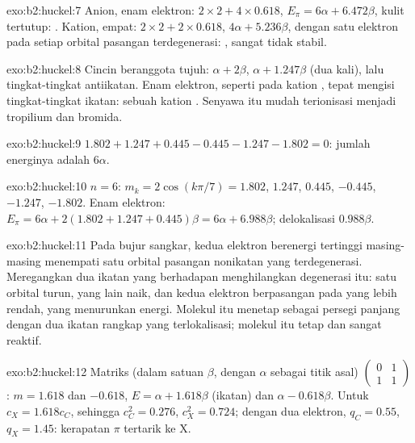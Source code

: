 \begin{solution}{exo:b2:huckel:7}
Anion, enam elektron: $2 \times 2 + 4 \times 0.618$, $E_\pi = 6\alpha + 6.472\beta$,
kulit tertutup: . Kation, empat: $2 \times 2 + 2 \times 0.618$,
$4\alpha + 5.236\beta$, dengan satu elektron pada setiap orbital pasangan
terdegenerasi: , sangat tidak stabil.
\end{solution}

\begin{solution}{exo:b2:huckel:8}
Cincin beranggota tujuh: $\alpha + 2\beta$, $\alpha + 1.247\beta$ (dua kali), lalu
tingkat-tingkat antiikatan. Enam elektron, seperti pada kation
, tepat mengisi tingkat-tingkat ikatan: sebuah kation
. Senyawa itu mudah terionisasi menjadi tropilium dan bromida.
\end{solution}

\begin{solution}{exo:b2:huckel:9}
$1.802 + 1.247 + 0.445 - 0.445 - 1.247 - 1.802 = 0$: jumlah energinya adalah $6\alpha$.
\end{solution}

\begin{solution}{exo:b2:huckel:10}
$n = 6$: $m_k = 2\cos(k\pi/7) = 1.802$, $1.247$, $0.445$, $-0.445$, $-1.247$,
$-1.802$. Enam elektron:
$E_\pi = 6\alpha + 2(1.802 + 1.247 + 0.445)\beta = 6\alpha + 6.988\beta$;
delokalisasi $0.988\beta$.
\end{solution}

\begin{solution}{exo:b2:huckel:11}
Pada bujur sangkar, kedua elektron berenergi tertinggi masing-masing
menempati satu orbital pasangan nonikatan yang terdegenerasi.
Meregangkan dua ikatan yang berhadapan menghilangkan degenerasi itu:
satu orbital turun, yang lain naik, dan kedua elektron berpasangan pada
yang lebih rendah, yang menurunkan energi. Molekul itu menetap sebagai
persegi panjang dengan dua ikatan rangkap yang terlokalisasi; molekul itu
tetap  dan sangat reaktif.
\end{solution}

\begin{solution}{exo:b2:huckel:12}
Matriks (dalam satuan $\beta$, dengan $\alpha$ sebagai titik asal)
$\begin{pmatrix}0 & 1\\ 1 & 1\end{pmatrix}$: $m = 1.618$ dan $-0.618$,
$E = \alpha + 1.618\beta$ (ikatan) dan $\alpha - 0.618\beta$. Untuk  $c_X = 1.618c_C$, sehingga $c_C^2 = 0.276$, $c_X^2 = 0.724$; dengan dua
elektron, $q_C = 0.55$, $q_X = 1.45$: kerapatan $\pi$ tertarik ke X.
\end{solution}

